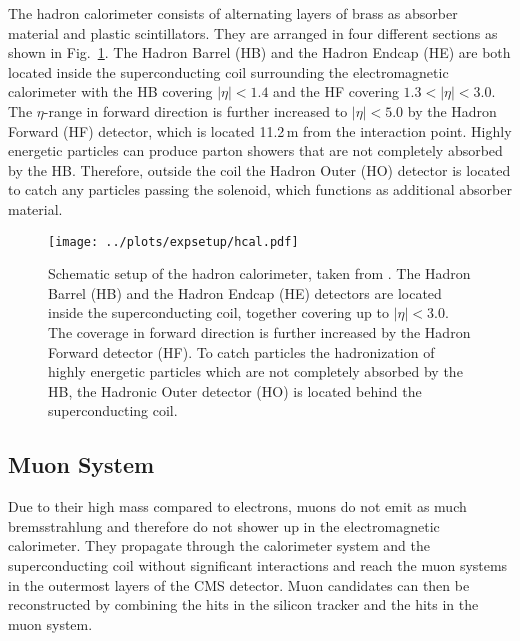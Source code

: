 \noindent The hadron calorimeter consists of alternating layers of brass as absorber material and plastic scintillators. They are arranged in four different sections as shown in Fig.~\ref{fig:expsetup:hcal}. The Hadron Barrel (HB) and the Hadron Endcap (HE) are both located inside the superconducting coil surrounding the electromagnetic calorimeter with the HB covering $|\eta|<1.4$ and the HF covering $1.3<|\eta|<3.0$. The $\eta$-range in forward direction is further increased to $|\eta|<5.0$ by the Hadron Forward (HF) detector, which is located 11.2\,m from the interaction point. Highly energetic particles can produce parton showers that are not completely absorbed by the HB. Therefore, outside the coil the Hadron Outer (HO) detector is located to catch any particles passing the solenoid, which functions as additional absorber material.
\begin{figure}
	\centering
	\texttt{[image: ../plots/expsetup/hcal.pdf]}
	\caption[Schematic setup of the hadron calorimeter]{Schematic setup of the hadron calorimeter, taken from \cite{hcal_fig}. The Hadron Barrel (HB) and the Hadron Endcap (HE) detectors are located inside the superconducting coil, together covering up to $|\eta|<3.0$. The coverage in forward direction is further increased by the Hadron Forward detector (HF). To catch particles the hadronization of highly energetic particles which are not completely absorbed by the HB, the Hadronic Outer detector (HO) is located behind the superconducting coil.}
	\label{fig:expsetup:hcal}
\end{figure}

\subsection*{Muon System}
Due to their high mass compared to electrons, muons do not emit as much bremsstrahlung and therefore do not shower up in the electromagnetic calorimeter. They propagate through the calorimeter system and the superconducting coil without significant interactions and reach the muon systems in the outermost layers of the CMS detector. Muon candidates can then be reconstructed by combining the hits in the silicon tracker and the hits in the muon system.\\

